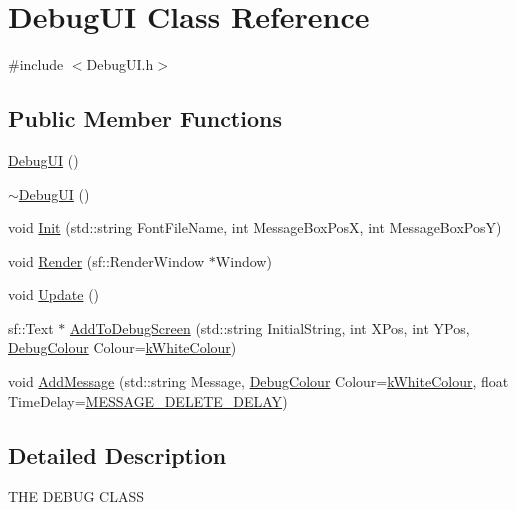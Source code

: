 \hypertarget{class_debug_u_i}{}\section{Debug\+UI Class Reference}
\label{class_debug_u_i}


{\ttfamily \#include $<$Debug\+U\+I.\+h$>$}

\subsection*{Public Member Functions}
\begin{DoxyCompactItemize}
\item 
\hyperlink{class_debug_u_i_a4b3d4e2cb69eff1e1dd7c9fa4070601a}{Debug\+UI} ()
\item 
\hyperlink{class_debug_u_i_a9c08c8a56117976e4b3a6873248f1ced}{$\sim$\+Debug\+UI} ()
\item 
void \hyperlink{class_debug_u_i_aeff0255f8d3c420a10ed04e665555774}{Init} (std\+::string Font\+File\+Name, int Message\+Box\+PosX, int Message\+Box\+PosY)
\item 
void \hyperlink{class_debug_u_i_afdb947e24f6aef1fdbbed54ee275cd46}{Render} (sf\+::\+Render\+Window $\ast$Window)
\item 
void \hyperlink{class_debug_u_i_a9cd779b785ef78f23ad8fb0f9e5e469a}{Update} ()
\item 
sf\+::\+Text $\ast$ \hyperlink{class_debug_u_i_a16964cf8ac1665e9dda3e86cc84f0483}{Add\+To\+Debug\+Screen} (std\+::string Initial\+String, int X\+Pos, int Y\+Pos, \hyperlink{_debug_u_i_8h_a508b2d1c58a6b1f2f8d1afdab60a289d}{Debug\+Colour} Colour=\hyperlink{_debug_u_i_8h_a508b2d1c58a6b1f2f8d1afdab60a289da3ed70705a90c9992072dc9362e041515}{k\+White\+Colour})
\item 
void \hyperlink{class_debug_u_i_a8bdf11a44f6308e6ac7a3fb9e9c15cc6}{Add\+Message} (std\+::string Message, \hyperlink{_debug_u_i_8h_a508b2d1c58a6b1f2f8d1afdab60a289d}{Debug\+Colour} Colour=\hyperlink{_debug_u_i_8h_a508b2d1c58a6b1f2f8d1afdab60a289da3ed70705a90c9992072dc9362e041515}{k\+White\+Colour}, float Time\+Delay=\hyperlink{_debug_u_i_8h_acac3d24a4253633d5c6fc707dff813ca}{M\+E\+S\+S\+A\+G\+E\+\_\+\+D\+E\+L\+E\+T\+E\+\_\+\+D\+E\+L\+AY})
\end{DoxyCompactItemize}


\subsection{Detailed Description}
T\+HE D\+E\+B\+UG C\+L\+A\+SS

